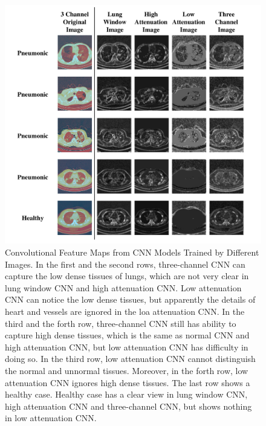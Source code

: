 \begin{figure}[t]
    \centerline{\includegraphics[width=180mm]{show.pdf}}
    \vspace{-0cm}
    \caption{Convolutional Feature Maps from CNN Models Trained by Different Images. In the first and the second rows, three-channel CNN can capture the low dense tissues of lungs, which are not very clear in lung window CNN and high attenuation CNN. Low attenuation CNN can notice the low dense tissues, but apparently the details of heart and vessels are ignored in the loa attenuation CNN. 
    In the third and the forth row, three-channel CNN still has ability to capture high dense tissues, which is the same as normal CNN and high attenuation CNN, but low attenuation CNN has difficulty in doing so. In the third row, low attenuation CNN cannot distinguish the normal and unnormal tissues. Moreover, in the forth row, low attenuation CNN ignores high dense tissues. The last row shows a healthy case. Healthy case has a clear view in lung window CNN, high attenuation CNN and three-channel CNN, but shows nothing in low attenuation CNN.}
    \vspace{-0cm}
    \label{show}
    \end{figure}

